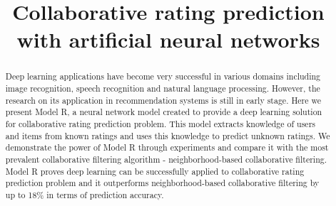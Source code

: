 \documentclass[letterpaper]{article}
\begin{document}
\lstset{language=python, tabsize=4}
\title{Collaborative rating prediction with artificial neural networks}

\maketitle

\begin{abstract}
	Deep learning applications have become very successful in various domains 
	including image recognition, speech recognition and natural language 
	processing.
	However, the research on its application in recommendation systems is 
	still in early stage.
	Here we present Model R, a neural network model created to provide a deep 
	learning solution for collaborative rating prediction problem.
	This model extracts knowledge of users and items from known ratings and 
	uses this knowledge to predict unknown ratings.
	We demonstrate the power of Model R through experiments and compare it with 
	the most prevalent collaborative filtering algorithm - neighborhood-based 
	collaborative filtering.
	Model R proves deep learning can be successfully applied to collaborative 
	rating prediction problem and it outperforms neighborhood-based 
	collaborative filtering by up to 18\% in terms of prediction accuracy.
\end{abstract}
\end{document}
